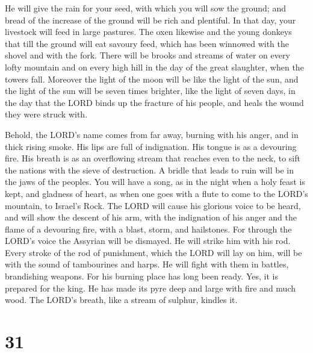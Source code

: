  He will give the rain for your seed, with which you will
sow the ground; and bread of the increase of the ground will be rich and
plentiful. In that day, your livestock will feed in large pastures.
 The oxen likewise and the young donkeys that till the
ground will eat savoury feed, which has been winnowed with the shovel
and with the fork.  There will be brooks and streams of
water on every lofty mountain and on every high hill in the day of the
great slaughter, when the towers fall.  Moreover the
light of the moon will be like the light of the sun, and the light of
the sun will be seven times brighter, like the light of seven days, in
the day that the LORD binds up the fracture of his people, and heals the
wound they were struck with.

 Behold, the LORD's name comes from far away, burning
with his anger, and in thick rising smoke. His lips are full of
indignation. His tongue is as a devouring fire.  His
breath is as an overflowing stream that reaches even to the neck, to
sift the nations with the sieve of destruction. A bridle that leads to
ruin will be in the jaws of the peoples.  You will have a
song, as in the night when a holy feast is kept, and gladness of heart,
as when one goes with a flute to come to the LORD's mountain, to
Israel's Rock.  The LORD will cause his glorious voice to
be heard, and will show the descent of his arm, with the indignation of
his anger and the flame of a devouring fire, with a blast, storm, and
hailstones.  For through the LORD's voice the Assyrian
will be dismayed. He will strike him with his rod.  Every
stroke of the rod of punishment, which the LORD will lay on him, will be
with the sound of tambourines and harps. He will fight with them in
battles, brandishing weapons.  For his burning place has
long been ready. Yes, it is prepared for the king. He has made its pyre
deep and large with fire and much wood. The LORD's breath, like a stream
of sulphur, kindles it.

\hypertarget{section-30}{%
\section{31}\label{section-30}}

